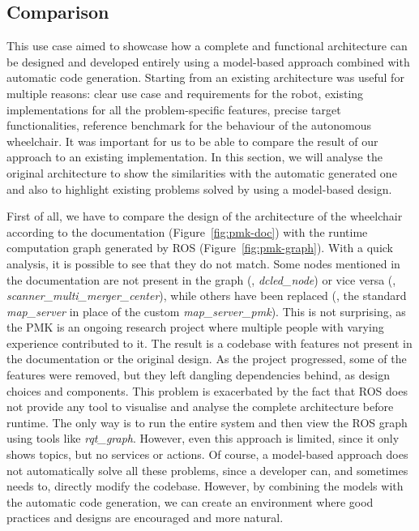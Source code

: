 \subsection{Comparison}
This use case aimed to showcase how a complete and functional architecture can be designed and developed entirely using a model-based approach combined with automatic code generation. Starting from an existing architecture was useful for multiple reasons: clear use case and requirements for the robot, existing implementations for all the problem-specific features, precise target functionalities, reference benchmark for the behaviour of the autonomous wheelchair. It was important for us to be able to compare the result of our approach to an existing implementation. In this section, we will analyse the original architecture to show the similarities with the automatic generated one and also to highlight existing problems solved by using a model-based design.

First of all, we have to compare the design of the architecture of the wheelchair according to the documentation (Figure~\ref{fig:pmk-doc}) with the runtime computation graph generated by ROS (Figure~\ref{fig:pmk-graph}). With a quick analysis, it is possible to see that they do not match. Some nodes mentioned in the documentation are not present in the graph (\eg, \textit{dcled\_node}) or vice versa (\eg, \textit{scanner\_multi\_merger\_center}), while others have been replaced (\eg, the standard \textit{map\_server} in place of the custom \textit{map\_server\_pmk}). This is not surprising, as the PMK is an ongoing research project where multiple people with varying experience contributed to it. The result is a codebase with features not present in the documentation or the original design. As the project progressed, some of the features were removed, but they left dangling dependencies behind, as design choices and components. This problem is exacerbated by the fact that ROS does not provide any tool to visualise and analyse the complete architecture before runtime. The only way is to run the entire system and then view the ROS graph using tools like \textit{rqt\_graph}. However, even this approach is limited, since it only shows topics, but no services or actions. Of course, a model-based approach does not automatically solve all these problems, since a developer can, and sometimes needs to, directly modify the codebase. However, by combining the models with the automatic code generation, we can create an environment where good practices and designs are encouraged and more natural.

